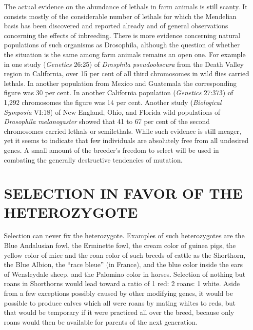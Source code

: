 The actual evidence on the abundance of lethals in farm animals is
still scanty. It consists mostly of the considerable number of lethals for
which the Mendelian basis has been discovered and reported already
and of general observations concerning the effects of inbreeding. There
is more evidence concerning natural populations of such organisms as
Drosophila, although the question of whether the situation is the same
among farm animals remains an open one. For example in one study
(\textit{Genetics} 26:25) of \textit{Drosphila pseudoobscura} from the Death Valley
region in California, over 15 per cent of all third chromosomes in wild
flies carried lethals. In another population from Mexico and Guatemala
the corresponding figure was 30 per cent. In another California population
(\textit{Genetics} 27:373) of 1,292 chromosomes the figure was 14 per cent.
Another study (\textit{Biological Symposia} VI:18) of New England, Ohio, and
Florida wild populations of \textit{Drosophila melanogaster} showed that 41 to
67 per cent of the second chromosomes carried lethals or semilethals.
While such evidence is still meager, yet it seems to indicate that few
individuals are absolutely free from all undesired genes. A small
amount of the breeder's freedom to select will be used in combating
the generally destructive tendencies of mutation.

\section*{SELECTION IN FAVOR OF THE HETEROZYGOTE}

Selection can never fix the heterozygote. Examples of such heterozygotes
are the Blue Andalusian fowl, the Erminette fowl, the cream color
of guinea pigs, the yellow color of mice and the roan color of such
breeds of cattle as the Shorthorn, the Blue Albion, the ``race bleue'' (in
France), and the blue color inside the ears of Wensleydale sheep, and
the Palomino color in horses. Selection of nothing but roans in
Shorthorns would lead toward a ratio of 1 red: 2 roans: 1 white. Aside
from a few exceptions possibly caused by other modifying genes, it
would be possible to produce calves which all were roans by mating
whites to reds, but that would be temporary if it were practiced all
over the breed, because only roans would then be available for parents
of the next generation.

